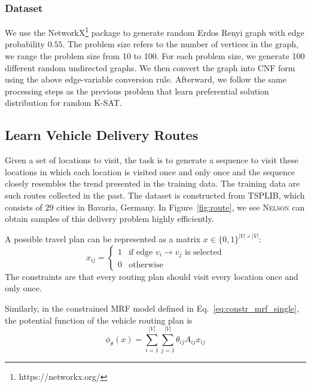 \documentclass[letterpaper]{article} %
\newcommand{\nls}{\textsc{Nelson}\xspace}
\begin{document}
\subsubsection{Dataset} {We use the NetworkX\footnote{https://networkx.org/} package to generate random Erdos Renyi graph with edge probability $0.55$. The problem size refers to the number of vertices in the graph, we range the problem size from 10 to 100. For each problem size, we generate 100 different random undirected graphs. We then convert the graph into CNF form using the above edge-variable conversion rule. Afterward, we follow the same processing steps as the previous problem that learn preferential solution distribution for random K-SAT. }

%

\subsection{Learn Vehicle Delivery Routes}
Given a set of locations to visit, the task is to generate a sequence to visit these locations in which each location is visited once and only once and the sequence closely resembles the trend presented in the training data.  The training data are such routes collected in the past.  
The dataset is constructed from TSPLIB, which consists of $29$ cities in Bavaria, Germany. 
%
In Figure~\ref{fig:route}, we see  \nls can obtain samples of this delivery problem highly efficiently. %

A possible travel plan can be represented as a matrix $x\in\{0,1\}^{|V|\times |V|}$:
\begin{equation}\label{eq:route}
x_{ij}=\begin{cases}
1& \text{if edge } v_i\to v_j \text{ is selected}\\
0&\text{otherwise}
\end{cases}
\end{equation}
The constraints are that every  routing plan should visit every location once and only once.

Similarly, in the constrained MRF model defined in Eq.~\eqref{eq:constr_mrf_single}, the potential function of the vehicle routing plan is
\begin{equation*}
 \phi_{\theta}(x)=\sum_{i=1}^{|V|}\sum_{j=1}^{|V|}\theta_{ij}A_{ij}x_{ij}
\end{equation*}

%
\end{document}
